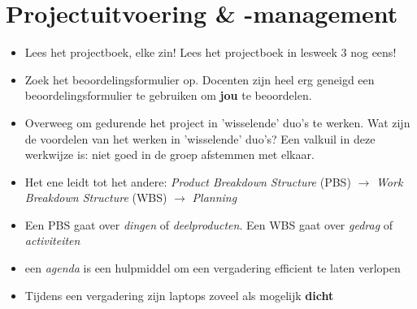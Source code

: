 \documentclass[24pt,a4paper]{article}
\begin{document}
\section{Projectuitvoering \& -management}
\begin{itemize}
      \mssep
      \item Lees het projectboek, elke zin! Lees het projectboek in lesweek 3 nog eens!
      \item Zoek het beoordelingsformulier op.
            Docenten zijn heel erg geneigd een beoordelingsformulier te gebruiken om \textbf{jou} te beoordelen.
      \item Overweeg om gedurende het project in 'wisselende' duo's te werken.
            Wat zijn de voordelen van het werken in 'wisselende' duo's?
            Een valkuil in deze werkwijze is: niet goed in de groep afstemmen met elkaar.
      \item Het ene leidt tot het andere: \textit{Product Breakdown Structure} (PBS) \textbf{$\rightarrow$} \textit{Work Breakdown Structure} (WBS)
            $\rightarrow$ \textit{Planning}
      \item Een PBS gaat over \textit{dingen} of \textit{deelproducten}. Een WBS gaat over \textit{gedrag} of \textit{activiteiten}
      \item een \textit{agenda} is een hulpmiddel om een vergadering efficient te laten verlopen
      \item Tijdens een vergadering zijn laptops zoveel als mogelijk \textbf{dicht}
\end{itemize}
\end{document}
